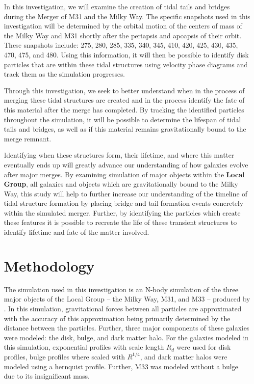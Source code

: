 \documentclass[fleqn,usenatbib]{mnras}
\begin{document}
In this investigation, we will examine the creation of tidal tails and bridges during the Merger of M31 and the Milky Way. The specific snapshots used in this investigation will be determined by the orbital motion of the centers of mass of the Milky Way and M31 shortly after the periapsis and apoapsis of their orbit. These snapshots include: 275, 280, 285, 335, 340, 345, 410, 420, 425, 430, 435, 470, 475, and 480. Using this information, it will then be possible to identify disk particles that are within these tidal structures using velocity phase diagrams and track them as the simulation progresses.

Through this investigation, we seek to better understand when in the process of merging these tidal structures are created and in the process identify the fate of this material after the merge has completed. By tracking the identified particles throughout the simulation, it will be possible to determine the lifespan of tidal tails and bridges, as well as if this material remains gravitationally bound to the merge remnant.

Identifying when these structures form, their lifetime, and where this matter eventually ends up will greatly advance our understanding of how galaxies evolve after major merges. By examining simulation of major objects within the \textbf{Local Group}, all galaxies and objects which are gravitationally bound to the Milky Way, this study will help to further increase our understanding of the timeline of tidal structure formation by placing bridge and tail formation events concretely within the simulated merger. Further, by identifying the particles which create these features it is possible to recreate the life of these transient structures to identify lifetime and fate of the matter involved.

\section{Methodology}

The simulation used in this investigation is an N-body simulation of the three major objects of the Local Group -- the Milky Way, M31, and M33 -- produced by \cite{van_der_Marel_Besla_2012}. In this simulation, gravitational forces between all particles are approximated with the accuracy of this approximation being primarily determined by the distance between the particles. Further, three major components of these galaxies were modeled: the disk, bulge, and dark matter halo. For the galaxies modeled in this simulation, exponential profiles with scale length $R_{d}$ were used for disk profiles, bulge profiles where scaled with $R^{1/4}$, and dark matter halos were modeled using a hernquist profile. Further, M33 was modeled without a bulge due to its insignificant mass.
\end{document}
